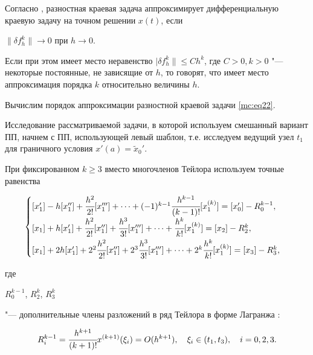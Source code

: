 Согласно \cite{mc:bib6, mc:bib8},  разностная краевая задача аппроксимирует дифференциальную краевую задачу на точном решении  $x(t)$, если 

$\|\delta f_h^k\| \to 0$  при $h\to 0$. 

Если при этом имеет место неравенство  $|\delta f_h^k\|\leq Ch^k$, где $C>0,  k>0$ "--- некоторые постоянные, не зависящие от $h$, то говорят, что имеет место аппроксимация порядка $k$ относительно величины $h$.







Вычислим порядок аппроксимации разностной краевой задачи \eqref{mc:eq22}.



Исследование рассматриваемой задачи, в которой используем смешанный вариант ПП, начнем с ПП, использующей левый шаблон, т.е. исследуем ведущий узел $   t_1$ для граничного условия $  x'(a)=\widetilde{x}_0'$.



При фиксированном $k\geq3$ вместо многочленов Тейлора используем точные равенства

\begin{gather}

\label{mc:eq26}

\begin{cases}

  [x_1']-h [x''_1]+\cfrac{h^{2}}{2!} [x_{1}''']+\dots+(-1)^{k-1}\cfrac{h^{k-1}}{(k-1)!} [x_1^{(k)}]=[x_{0}']-R_{0}^{k-1},\\[2mm]

   [x_1]+h[x_1']+\cfrac{h^2}{2!} [x''_1]+\cfrac{h^3}{3!} [x'''_1]+\dots+\cfrac{h^k}{k!} [x_1^{(k)}]=[x_{2}]-R_{2}^k,\\[2mm]

   [x_1]+2h[x_1']+2^2\cfrac{h^2}{2!} [x''_1]+2^3\cfrac{h^3}{3!} [x'''_1]+\dots+2^k\cfrac{h^k}{k!} [x_1^{(k)}]=[x_{3}]-R_{3}^k,

\end{cases}

\end{gather}

где

$   R^{k-1}_{0}$, $R^k_{2}$, $R^k_{3}$

 "--- дополнительные члены разложений в ряд Тейлора в форме Лагранжа \cite{mc:bib14}:

\begin{gather*} 

R^{k-1}_{i} =\cfrac{h^{k+1}}{(k+1)!} x^{(k+1)} (\xi_i) =O(h^{k+1}), \quad \xi_i \in (t_{1},  t_{3}), \quad i =0, 2, 3.\end{gather*}


